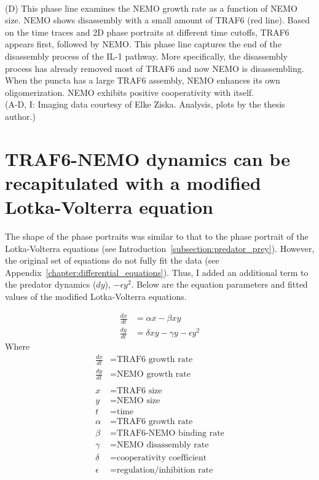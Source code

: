 \begin{centering}
{\vspace{1em}
\\
(D) This phase line examines the NEMO growth rate as a function of NEMO size. NEMO shows disassembly with a small amount of TRAF6 (red line). Based on the time traces and 2D phase portraits at different time cutoffs, TRAF6 appears first, followed by NEMO. This phase line captures the end of the disassembly process of the IL-1 pathway. More specifically, the disassembly process has already removed most of TRAF6 and now NEMO is disassembling. When the puncta has a large TRAF6 assembly, NEMO enhances its own oligomerization. NEMO exhibits positive cooperativity with itself.
\vspace{1em}
\\
(A-D, I: Imaging data courtesy of Elke Ziska. Analysis, plots by the thesis author.)}
\label{p2:6c}
\end{centering}

\section{TRAF6-NEMO dynamics can be recapitulated with a modified Lotka-Volterra equation}
The shape of the phase portraits was similar to that to the phase portrait of the Lotka-Volterra equations (see Introduction~\ref{subsection:predator_prey}). However, the original set of equations do not fully fit the data (see Appendix~\ref{chapter:differential_equations}). Thus, I added an additional term to the predator dynamics ($dy$), $- \epsilon y^2$. Below are the equation parameters and fitted values of the modified Lotka-Volterra equations.

\begin{equation*}
\begin{aligned}
\frac{dx}{dt} &= \alpha x - \beta xy \\
\frac{dy}{dt} &= \delta xy -\gamma y - \epsilon y^2 
\end{aligned}
\end{equation*}
Where
\begin{equation*}
\begin{aligned}
\frac{dx}{dt} &= \text{TRAF6 growth rate} \\
\frac{dy}{dt} &= \text{NEMO growth rate} \\
\\
x &= \text{TRAF6 size} \\
y &= \text{NEMO size} \\
t &= \text{time} \\
\alpha & = \text{TRAF6 growth rate} \\
\beta & = \text{TRAF6-NEMO binding rate} \\
\gamma & = \text{NEMO disassembly rate} \\
\delta & = \text{cooperativity coefficient} \\
\epsilon & = \text{regulation/inhibition rate}
\end{aligned}
\end{equation*}

